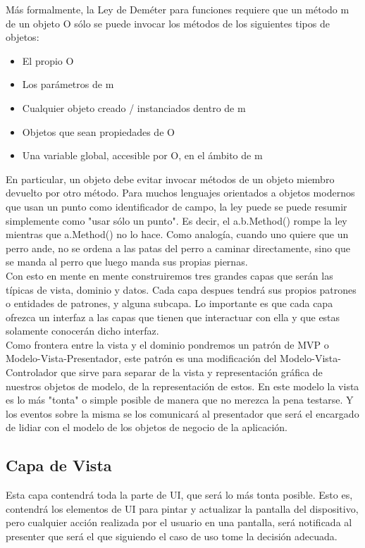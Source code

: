 \documentclass[../pfc.tex]{subfiles}
\begin{document}
	Más formalmente, la Ley de Deméter para funciones requiere que un método m de un objeto O sólo se puede invocar los métodos de los siguientes tipos de objetos:
	\begin{itemize} 
		\item El propio O
		\item Los parámetros de m
		\item Cualquier objeto creado / instanciados dentro de m
		\item Objetos que sean propiedades de O
		\item Una variable global, accesible por O, en el ámbito de m
	\end{itemize}
	
	En particular, un objeto debe evitar invocar métodos de un objeto miembro devuelto por otro método. Para muchos lenguajes orientados a objetos modernos que usan un punto como identificador de campo, la ley puede se puede resumir simplemente como "usar sólo un punto". Es decir, el a.b.Method() rompe la ley mientras que a.Method() no lo hace. Como analogía, cuando uno quiere que un perro ande, no se ordena a las patas del perro a caminar directamente, sino que se manda al perro que luego manda sus propias piernas.\\
		
	Con esto en mente en mente construiremos tres grandes capas que serán las típicas de vista, dominio y datos. Cada capa despues tendrá sus propios patrones o entidades de patrones, y alguna subcapa. Lo importante es que cada capa ofrezca un interfaz a las capas que tienen que interactuar con ella y que estas solamente conocerán dicho interfaz.  \\
	
	Como frontera entre la vista y el dominio pondremos un patrón de MVP o Modelo-Vista-Presentador, este patrón es una modificación del Modelo-Vista-Controlador que sirve para separar de la vista y representación gráfica de nuestros objetos de modelo, de la representación de estos. En este modelo la vista es lo más "tonta" o simple posible de manera que no merezca la pena testarse. Y los eventos sobre la misma se los comunicará al presentador que será el encargado de lidiar con el modelo de los objetos de negocio de la aplicación.  
	
	\subsection{Capa de Vista}
	
	Esta capa contendrá toda la parte de UI, que será lo más tonta posible. Esto es, contendrá los elementos de UI para pintar y actualizar la pantalla del dispositivo, pero cualquier acción realizada por el usuario en una pantalla, será notificada al presenter que será el que siguiendo el caso de uso tome la decisión adecuada.\\ 
	
\end{document}
